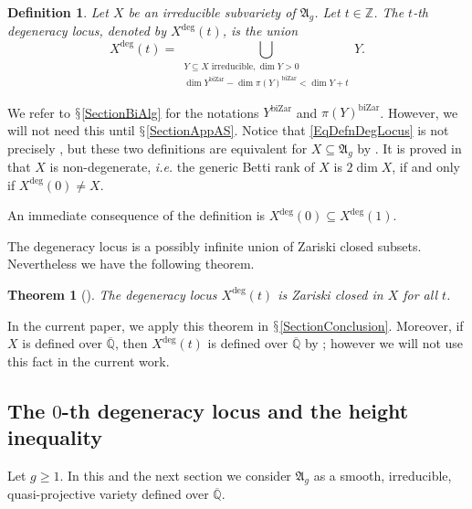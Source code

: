 \documentclass[12pt,oneside]{amsart}
\newcounter{maincounter}
\numberwithin{maincounter}{section}
\numberwithin{equation}{section}
\newtheorem{theorem}[maincounter]{Theorem}
\newtheorem{definition}[maincounter]{Definition}
\def\ZZ{\mathbb{Z}}
\def\QQ{\mathbb{Q}}
\newcommand{\IQbar}{{\overline{\QQ}}}
\newcommand{\IZ}{{\ZZ}}
\begin{document}
\begin{definition}
Let $X$ be an irreducible subvariety of $\mathfrak{A}_g$. Let $t \in \IZ$. The $t$-th degeneracy locus, denoted by $X^{\mathrm{deg}}(t)$, is the union
\begin{equation}\label{EqDefnDegLocus}
X^{\mathrm{deg}}(t) = \bigcup_{\substack{Y \subseteq X\text{ irreducible,}~ \dim Y > 0 \\ \dim Y^{\mathrm{biZar}} - \dim \pi(Y)^{\mathrm{biZar}} < \dim Y + t}} Y.
\end{equation}
\end{definition}
We refer to $\mathsection$\ref{SectionBiAlg} for the notations
$Y^{\mathrm{biZar}}$ and $\pi(Y)^{\mathrm{biZar}}$. However, we will
not need this until $\mathsection$\ref{SectionAppAS}. Notice that
\eqref{EqDefnDegLocus} is not precisely \cite[Definition~1.6]{GaoBettiRank}, but these two definitions are equivalent for $X
\subseteq \mathfrak{A}_g$ by \cite[Corollary~5.4]{GaoBettiRank}. It is proved in \cite{GaoBettiRank} that $X$ is non-degenerate, \textit{i.e.} the generic Betti rank of $X$ is $2\dim X$, if and only if $X^{\mathrm{deg}}(0) \not= X$.

An immediate consequence of the definition is $X^{\mathrm{deg}}(0) \subseteq X^{\mathrm{deg}}(1)$.

The degeneracy locus is a possibly infinite union of Zariski closed
subsets. Nevertheless we have the following theorem.
\begin{theorem}[{\!\!\cite[Theorem~1.8]{GaoBettiRank}}]
   \label{ThmDegLocusZarClosed}
   The degeneracy locus $X^{\mathrm{deg}}(t)$ is  Zariski closed
   in $X$ for all $t$.
\end{theorem} 

In the current paper, we apply this theorem in
$\mathsection$\ref{SectionConclusion}. Moreover, if $X$ is defined
over $\IQbar$, then $X^{\mathrm{deg}}(t)$ is defined over $\IQbar$ by
\cite[Theorem~4.2.4]{GaoHDR}; however we will not use this fact in the
current work. %



\subsection{The $0$-th degeneracy locus and the height inequality}
Let $g\ge 1$. In this and the next section we consider $\mathfrak{A}_g$ as a smooth,
irreducible, quasi-projective variety defined over $\IQbar$.
\end{document}
